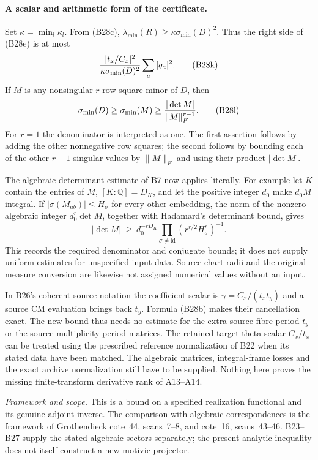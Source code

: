 \documentclass[11pt]{article}
\newcommand{\Q}{\mathbb Q}\newcommand{\C}{\mathbb C}\newcommand{\Z}{\mathbb Z}\newcommand{\R}{\mathbb R}\newcommand{\A}{\mathbb A}\newcommand{\OO}{\mathcal O}
\newcommand{\framework}[1]{\par\smallskip\noindent\textit{Framework and scope.} #1\par}
\theoremstyle{definition}\newtheorem{definition}[theorem]{Definition}\newtheorem{remark}[theorem]{Remark}
\begin{document}
\paragraph{A scalar and arithmetic form of the certificate.}
Set $\kappa=\min_l\kappa_l$.  From (B28c),
$\lambda_{\min}(R)\geq\kappa\sigma_{\min}(D)^2$.
Thus the right side of (B28e) is at most
\[
       {|t_x/C_x|^2\over\kappa\sigma_{\min}(D)^2}
                          \sum_a|q_a|^2.
 \tag{B28k}
\]
If $M$ is any nonsingular $r$-row square minor of $D$,
then
\[
 \sigma_{\min}(D)\geq\sigma_{\min}(M)
              \geq { |\det M|\over\|M\|_F^{r-1}}.
 \tag{B28l}
\]
For $r=1$ the denominator is interpreted as one.  The
first assertion follows by adding the other nonnegative
row squares; the second follows by bounding each of the
other $r-1$ singular values by $\|M\|_F$ and using their
product $|\det M|$.

The algebraic determinant estimate of B7 now applies
literally.  For example let $K$ contain the entries of $M$,
$[K:\Q]=D_K$, and let the positive integer $d_0$ make
$d_0M$ integral.  If
$|\sigma(M_{ab})|\leq H_\sigma$ for every other embedding,
the norm of the nonzero algebraic integer
$d_0^r\det M$, together with Hadamard's determinant bound,
gives
\[
 |\det M|\ \geq\ d_0^{-rD_K}
       \prod_{\sigma\ne\mathrm{id}}
                      (r^{r/2}H_\sigma^r)^{-1}.
 \tag{B28m}
\]
This records the required denominator and conjugate bounds;
it does not supply uniform estimates for unspecified input
data.  Source chart radii and the original measure conversion
are likewise not assigned numerical values without an input.

In B26's coherent-source notation the coefficient scalar is
$\gamma=C_x/(t_xt_y)$ and a source CM evaluation brings back
$t_y$.  Formula (B28b) makes their cancellation exact.  The
new bound thus needs no estimate for the extra source fibre
period $t_y$ or the source multiplicity-period matrices.
The retained target theta scalar $C_x/t_x$ can be treated
using the prescribed reference normalization of B22 when
its stated data have been matched.  The algebraic matrices,
integral-frame losses and the exact archive normalization
still have to be supplied.  Nothing here proves the missing
finite-transform derivative rank of A13--A14.

\framework{This is a bound on a specified realization
functional and its genuine adjoint inverse.  The comparison
with algebraic correspondences is the framework of
Grothendieck cote~44, scans~7--8, and cote~16, scans~43--46.
B23--B27 supply the stated algebraic sectors separately;
the present analytic inequality does not itself construct
a new motivic projector.}
\end{document}

